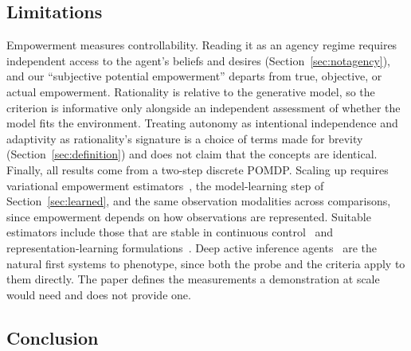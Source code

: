 \documentclass[pdflatex,sn-apa]{sn-jnl}%
\theoremstyle{definition}
\begin{document}
\subsection{Limitations}
Empowerment measures controllability. Reading it as an agency regime requires independent access to the agent's beliefs and desires (Section~\ref{sec:notagency}), and our ``subjective potential empowerment'' departs from true, objective, or actual empowerment. Rationality is relative to the generative model, so the criterion is informative only alongside an independent assessment of whether the model fits the environment. Treating autonomy as intentional independence and adaptivity as rationality's signature is a choice of terms made for brevity (Section~\ref{sec:definition}) and does not claim that the concepts are identical. Finally, all results come from a two-step discrete POMDP. Scaling up requires variational empowerment estimators~\citep{mohamedVariationalInformationMaximisation2015}, the model-learning step of Section~\ref{sec:learned}, and the same observation modalities across comparisons, since empowerment depends on how observations are represented. Suitable estimators include those that are stable in continuous control~\citep{zhaoEfficientEmpowerment2021} and representation-learning formulations~\citep{choiVariationalEmpowerment2021}. Deep active inference agents~\citep{fountasDeepActiveInference2020} are the natural first systems to phenotype, since both the probe and the criteria apply to them directly. The paper defines the measurements a demonstration at scale would need and does not provide one.

\subsection{Conclusion}
\end{document}
